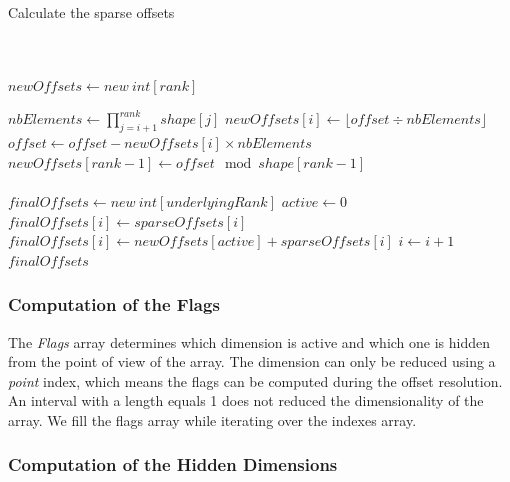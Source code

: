 \begin{algorithm}
	\caption{Calculate the sparse offsets}
	\label{alg:sparseOffsets}
\begin{algorithmic}
	\Statex
	\\
	\\
	\State $newOffsets\gets new\ int[rank]$ 
	
	\State $nbElements \gets \prod_{j=i+1}^{rank} shape[j]$
	\State $newOffsets[i] \gets \lfloor offset \div nbElements\rfloor$
	\State $offset \gets offset - newOffsets[i] \times nbElements$
	\EndFor
	\State $newOffsets[rank-1] \gets offset \mod shape[rank-1]$ 
	\\
	\\	
	\State $finalOffsets\gets new\ int[underlyingRank]$	
	\State $active\gets 0$
	 
	\State $finalOffsets[i] \gets sparseOffsets[i]$
	\Else
	\State $finalOffsets[i] \gets newOffsets[active] + sparseOffsets[i]$
	\State $i \gets i + 1$
	\EndIf
	\EndFor\\
	\Return $finalOffsets$
\EndProcedure
\end{algorithmic}
\end{algorithm}

	

\subsubsection{Computation of the Flags}
The \textit{Flags} array determines which dimension is active and which one is hidden from the point of view of the array. The \textbf{}dimension can only be reduced using a \textit{point} index, which means the flags can be computed during the offset resolution. An interval with a length equals 1 does not reduced the dimensionality of the array. We fill the flags array while iterating over the indexes array.

\subsubsection{Computation of the Hidden Dimensions}

